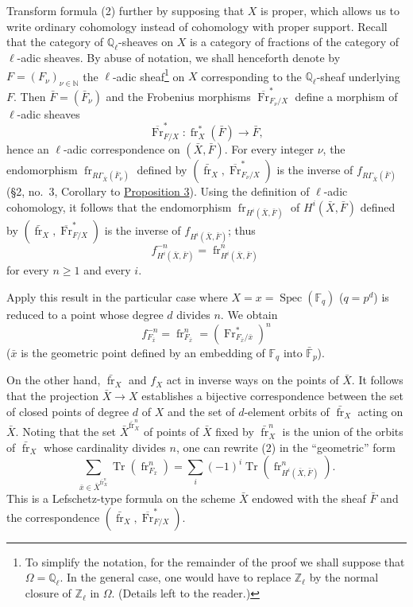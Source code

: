 \documentclass[11pt]{article}
\DeclareMathOperator{\Spec}{Spec}
\providecommand{\Tr}{\operatorname{Tr}}
\providecommand{\Tr}{\operatorname{Tr}}
\providecommand{\Tr}{\operatorname{Tr}}
\providecommand{\Tr}{\operatorname{Tr}}
\providecommand{\Spec}{\operatorname{Spec}}
\providecommand{\Spec}{\operatorname{Spec}}
\providecommand{\Spec}{\operatorname{Spec}}
\providecommand{\Tr}{\operatorname{Tr}}
\providecommand{\fr}{\operatorname{fr}}
\providecommand{\Fr}{\operatorname{Fr}}
\providecommand{\Fr}{\operatorname{Fr}}
\providecommand{\fr}{\operatorname{fr}}
\providecommand{\Spec}{\operatorname{Spec}}
\begin{document}
Transform formula (2) further by supposing that $X$ is proper, which
allows us to write ordinary cohomology instead of cohomology with
proper support. Recall that the category of $\mathbb Q_\ell$-sheaves
on $X$ is a category of fractions of the category of $\ell$-adic
sheaves. By abuse of notation, we shall henceforth denote by
$F=(F_\nu)_{\nu\in\mathbb N}$ the $\ell$-adic
sheaf\footnote{To simplify the notation, for the remainder of the
proof we shall suppose that $\Omega=\mathbb Q_\ell$. In the general
case, one would have to replace $\mathbb Z_\ell$ by the normal closure
of $\mathbb Z_\ell$ in $\Omega$. (Details left to the reader.)}
on $X$ corresponding to the $\mathbb Q_\ell$-sheaf underlying $F$.
Then $\bar F=(\bar F_\nu)$ and the Frobenius morphisms
$\overline{\Fr}^*_{F_\nu/X}$ define a morphism of $\ell$-adic sheaves
\[
\overline{\Fr}^*_{F/X}:
\fr_X^*(\bar F)\longrightarrow\bar F,
\]
hence an $\ell$-adic correspondence on $(\bar X,\bar F)$. For every
integer $\nu$, the endomorphism
$\fr_{R\Gamma_{\bar X}(\bar F_\nu)}$ defined by
$(\bar{\fr}_X,\overline{\Fr}^*_{F_\nu/X})$ is the inverse of
$f_{R\Gamma_{\bar X}(\bar F)}$ (§2, no.~3, Corollary to \hyperref[sga5:XV:proposition:3]{Proposition 3}).
Using the definition of $\ell$-adic cohomology, it follows that the
endomorphism $\fr_{H^i(\bar X,\bar F)}$ of $H^i(\bar X,\bar F)$
defined by $(\bar{\fr}_X,\overline{\Fr}^*_{F/X})$ is the inverse of
$f_{H^i(\bar X,\bar F)}$; thus
\[
f^{-n}_{H^i(\bar X,\bar F)}
=\fr^n_{H^i(\bar X,\bar F)}
\]
for every $n\ge1$ and every $i$.

Apply this result in the particular case where $X=x=\Spec(\mathbb F_q)$ ($q=p^d$) is reduced to a point whose degree $d$ divides $n$. We obtain
\[
f^{-n}_{F_{\bar x}}=\fr^n_{F_{\bar x}}=(\Fr^*_{F_{\bar x}/\bar x})^n
\]
($\bar x$ is the geometric point defined by an embedding of $\mathbb F_q$ into $\bar{\mathbb F}_p$).

On the other hand, $\bar{\fr}_X$ and $f_X$ act in inverse ways on the points of $\bar X$. It follows that the projection $\bar X\to X$ establishes a bijective correspondence between the set of closed points of degree $d$ of $X$ and the set of $d$-element orbits of $\bar{\fr}_X$ acting on $\bar X$. Noting that the set $\bar X^{\bar{\fr}_X^n}$ of points of $\bar X$ fixed by $\bar{\fr}_X^n$ is the union of the orbits of $\bar{\fr}_X$ whose cardinality divides $n$, one can rewrite (2) in the ``geometric'' form
\[
\sum_{\bar x\in\bar X^{\bar{\fr}_X^n}}\Tr(\fr^n_{F_{\bar x}})
=\sum_i(-1)^i\Tr(\fr^n_{H^i(\bar X,\bar F)}).
\tag{2'}\label{sga5:XV:equation:2:2}
\]
This is a Lefschetz-type formula on the scheme $\bar X$ endowed with the sheaf $\bar F$ and the correspondence $(\bar{\fr}_X,\overline{\Fr}^*_{F/X})$.
\end{document}
